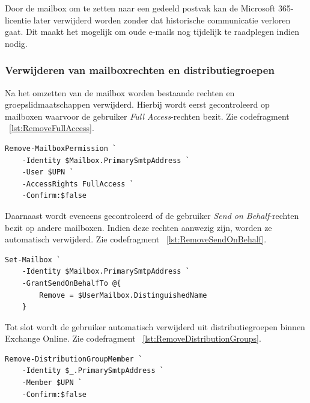 Door de mailbox om te zetten naar een gedeeld postvak kan de Microsoft 365-licentie later verwijderd worden zonder dat historische communicatie verloren gaat. Dit maakt het mogelijk om oude e-mails nog tijdelijk te raadplegen indien nodig.

\subsubsection{Verwijderen van mailboxrechten en distributiegroepen}

Na het omzetten van de mailbox worden bestaande rechten en groepslidmaatschappen verwijderd. Hierbij wordt eerst gecontroleerd op mailboxen waarvoor de gebruiker \textit{Full Access}-rechten bezit. Zie codefragment ~\ref{lst:RemoveFullAccess}.

\begin{listing}[ht]
\begin{verbatim}
Remove-MailboxPermission `
    -Identity $Mailbox.PrimarySmtpAddress `
    -User $UPN `
    -AccessRights FullAccess `
    -Confirm:$false
\end{verbatim}
\caption{Verwijderen van Full Access-rechten}
\label{lst:RemoveFullAccess}
\end{listing}

Daarnaast wordt eveneens gecontroleerd of de gebruiker \textit{Send on Behalf}-rechten bezit op andere mailboxen. Indien deze rechten aanwezig zijn, worden ze automatisch verwijderd. Zie codefragment ~\ref{lst:RemoveSendOnBehalf}.

\begin{listing}[ht]
\begin{verbatim}
Set-Mailbox `
    -Identity $Mailbox.PrimarySmtpAddress `
    -GrantSendOnBehalfTo @{
        Remove = $UserMailbox.DistinguishedName
    }
\end{verbatim}
\caption{Verwijderen van Send on Behalf}
\label{lst:RemoveSendOnBehalf}
\end{listing}

Tot slot wordt de gebruiker automatisch verwijderd uit distributiegroepen binnen Exchange Online. Zie codefragment ~\ref{lst:RemoveDistributionGroups}.

\begin{listing}[ht]
\begin{verbatim}
Remove-DistributionGroupMember `
    -Identity $_.PrimarySmtpAddress `
    -Member $UPN `
    -Confirm:$false
\end{verbatim}
\caption{Verwijderen uit distributiegroepen}
\label{lst:RemoveDistributionGroups}
\end{listing}


